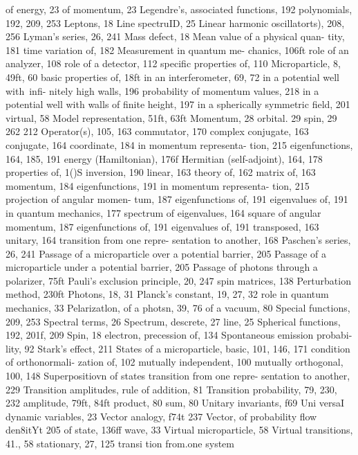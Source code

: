 \documentclass[a4paper,sfsidenotes,colorlinks=true]{tufte-book}
\numberwithin{equation}{section}
\numberwithin{figure}{section}
\begin{document}
{{{{{{{of energy, 23
of momentum, 23 Legendre's,
associated functions, 192
polynomials, 192, 209, 253 Leptons, 18 Line spectruID, 25 Linear harmonic oscillatorts),
208, 256 Lyman's series, 26, 241
Mass defect, 18 Mean value of a physical quan-
tity, 181 time variation of, 182
Measurement in quantum me- chanics, 106ft
role of an analyzer, 108 role of a detector, 112 specific properties of, 110
Microparticle, 8, 49ft, 60 basic properties of, 18ft in an interferometer, 69, 72 in a potential well with~infi-
nitely high walls, 196 probability of momentum
values, 218 in a potential well with walls
of finite height, 197 in a spherically symmetric
field, 201 virtual, 58
Model representation, 51ft, 63ft Momentum, 28
orbital. 29 spin, 29
262
212 Operator(s), 105, 163
commutator, 170 complex conjugate, 163 conjugate, 164 coordinate, 184
in momentum representa- tion, 215
eigenfunctions, 164, 185, 191 energy (Hamiltonian), 176f Hermitian (self-adjoint), 164,
178 properties of, 1()S
inversion, 190 linear, 163
theory of, 162 matrix of, 163 momentum, 184
eigenfunctions, 191 in momentum representa-
tion, 215 projection of angular momen-
tum, 187 eigenfunctions of, 191 eigenvalues of, 191
in quantum mechanics, 177 spectrum of eigenvalues, 164 square of angular momentum,
187 eigenfunctions of, 191 eigenvalues of, 191
transposed, 163 unitary, 164
transition from one repre- sentation to another,
168
Paschen's series, 26, 241 Passage of a microparticle over
a potential barrier, 205 Passage of a microparticle under a potential barrier, 205 Passage of photons through a
polarizer, 75ft Pauli's
exclusion principle, 20, 247
spin matrices, 138 Perturbation method, 230ft Photons, 18, 31 Planck's constant, 19, 27, 32
role in quantum mechanics, 33
Pelarizatlon, of a photsn, 39, 76 of a vacuum, 80
Special functions, 209, 253 Spectral terms, 26 Spectrum,
descrete, 27
line, 25 Spherical functions, 192, 201f,
209 Spin, 18
electron, precession of, 134 Spontaneous emission probabi-
lity, 92 Stark's effect, 211
States of a microparticle, basic, 101, 146, 171
condition of orthonormali- zation of, 102
mutually independent, 100 mutually orthogonal, 100, 148
Superpositiovn of states transition	from	one	repre- sentation to another,
229
Transition amplitudes, rule of addition, 81
Transition probability, 79, 230, 232
amplitude, 79ft, 84ft product, 80 sum, 80
Unitary invariants, f69 Uni versaI dynamic variables, 23
Vector analogy, f74t	237 Vector,
of probability flow den8itYt 205
of state, 136ff
wave, 33 Virtual microparticle, 58 Virtual transitions, 41., 58
stationary, 27, 125 transi tion	from.one	system
}}}}}}}
\end{document}
